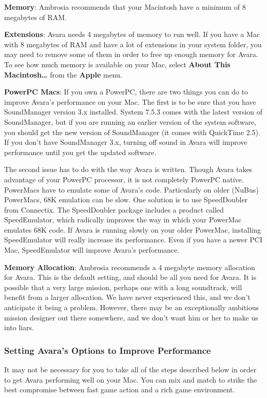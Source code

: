 \documentclass{article}
\begin{document}
\textbf{Memory}: Ambrosia recommends that your Macintosh have a minimum of 8 megabytes of RAM.

\textbf{Extensions}: Avara needs 4 megabytes of memory to run well. If you have a Mac with 8 megabytes of RAM and have a lot of extensions in your system folder, you may need to remove some of them in order to free up enough memory for Avara. To see how much memory is available on your Mac, select \textbf{About This Macintosh\dots} from the \textbf{Apple} menu.

\textbf{PowerPC Macs}: If you own a PowerPC, there are two things you can do to improve Avara's performance on your Mac. The first is to be sure that you have SoundManager version 3.x installed. System 7.5.3 comes with the latest version of SoundManager, but if you are running an earlier version of the system software, you should get the new version of SoundManager (it comes with QuickTime 2.5). If you don't have SoundManager 3.x, turning off sound in Avara will improve performance until you get the updated software.

The second issue has to do with the way Avara is written. Though Avara takes advantage of your PowerPC processor, it is not completely PowerPC native. PowerMacs have to emulate some of Avara's code. Particularly on older (NuBus) PowerMacs, 68K emulation can be slow. One solution is to use SpeedDoubler from Connectix. The SpeedDoubler package includes a product called SpeedEmulator, which radically improves the way in which your PowerMac emulates 68K code. If Avara is running slowly on your older PowerMac, installing SpeedEmulator will really increase its performance. Even if you have a newer PCI Mac, SpeedEmulator will improve Avara's performance.

\textbf{Memory Allocation}: Ambrosia recommends a 4 megabyte memory allocation for Avara. This is the default setting, and should be all you need for Avara. It is possible that a very large mission, perhaps one with a long soundtrack, will benefit from a larger allocation. We have never experienced this, and we don't anticipate it being a problem. However, there may be an exceptionally ambitious mission designer out there somewhere, and we don't want him or her to make us into liars.

\subsubsection{Setting Avara's Options to Improve Performance}
It may not be necessary for you to take all of the steps described below in order to get Avara performing well on your Mac. You can mix and match to strike the best compromise between fast game action and a rich game environment.
\end{document}
